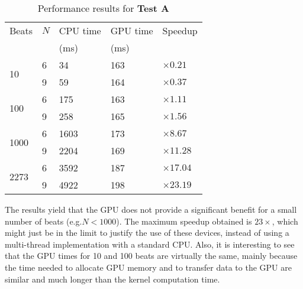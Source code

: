 \documentclass[runningheads]{llncs}
\begin{document}
\begin{table}[h]
\caption{Performance results for \textbf{Test A}}\label{tab:A}
\begin{minipage}[b]{\columnwidth}\centering
\renewcommand{\arraystretch}{1.2}
\begin{center}
\begin{tabular}{p{1 cm} p{1 cm} p{2 cm} p{2 cm} p{1 cm}}
Beats & $N$ & CPU time & GPU time & Speedup\\
      &     & (ms) & (ms) & \\\hline
\multirow{2}{*}{10} & 6 & 34 & 163 & $\times 0.21$ \\
 & 9 & 59 & 164 & $\times 0.37$ \\\hline
\multirow{2}{*}{100} & 6 & 175 & 163 & $\times 1.11$\\
 & 9 & 258 & 165 & $\times 1.56$ \\\hline
\multirow{2}{*}{1000} & 6 & 1603 & 173 & $\times 8.67$ \\
 & 9 & 2204 & 169 & $\times 11.28$ \\\hline
\multirow{2}{*}{2273} & 6 & 3592 & 187 & $\times 17.04$ \\
 & 9 & 4922 & 198 & $\times 23.19$ \\
\end{tabular}
\end{center}
\end{minipage}
\end{table}

The results yield that the GPU does not provide a significant benefit for a small number of beats (e.g.$N<1000$). The maximum speedup obtained is $23\times$, which might just be in the limit to justify the use of these devices, instead of using a multi-thread implementation with a standard CPU. Also, it is interesting to see that the GPU times for 10 and 100 beats are virtually the same, mainly because the time needed to allocate GPU memory and to transfer data to the GPU are similar and much longer than the kernel computation time.

\end{document}
